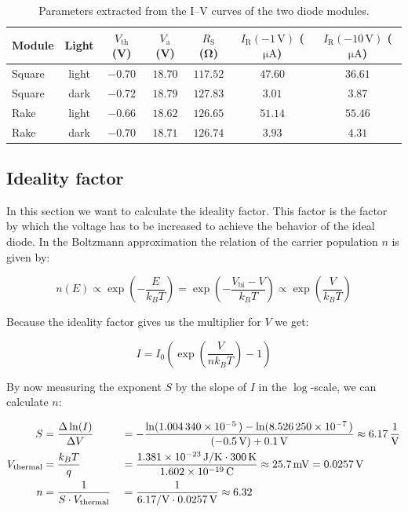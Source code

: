 \begin{table}[H]
\centering\small
\caption{Parameters extracted from the I--V curves of the two diode modules.}
\label{tab:diode-iv}
\begin{tabular}{lcccccc}
\toprule
Module & Light & $V_{\mathrm{th}}$ (V) & $V_\mathrm{a}$ (V) & $R_\mathrm{S}$ (\si{\ohm}) & $I_\mathrm{R}(-1\,\mathrm V)$ ($\si{\micro \A}$) & $I_\mathrm{R}(-10\,\mathrm V)$ ($\si{\micro \A}$)\\
\midrule
Square & light & $-0.70$ & $18.70$ & $117.52$ & $47.60$ & $36.61$ \\
Square & dark & $-0.72$ & $18.79$ & $127.83$ & $3.01$  & $3.87$  \\
Rake   & light & $-0.66$ & $18.62$ & $126.65$ & $51.14$ & $55.46$ \\
Rake   & dark & $-0.70$ & $18.71$ & $126.74$ & $3.93$  & $4.31$ \\
\bottomrule
\end{tabular}
\end{table}


\subsection{Ideality factor}\label{sec:iv-n}

In this section we want to calculate the ideality factor. This factor is the factor by which the voltage has to be increased
to achieve the behavior of the ideal diode. In the Boltzmann approximation the relation of the carrier population $n$ is given by:

\[
  n(E) \propto \exp\left(- \frac {E}{k_B T}\right) = \exp\left(- \frac {V_{\text{bi}} - V}{k_B T}\right) \propto \exp\left(\frac {V}{k_B T}\right)
\]

Because the ideality factor gives us the multiplier for $V$ we get:

\[
  I = I_0 \left(\exp\left(\frac {V}{ n k_B T}\right) - 1 \right)
\]

By now measuring the exponent $S$ by the slope of $I$ in the $\log$-scale, we can calculate $n$:

\begin{align*}
  S &= \frac{\Delta \ln(I)}{\Delta V}  &&= - \frac{\ln(\SI{1.004340e-5}) - \ln(\SI{8.526250e-7})}{(\SI{-0.5}{\V}) +\SI{0.1}{\V}}  \approx  \SI {6,17}{ \frac{1}{\V}} \\
  V_{\text{thermal}} &= \frac{k_B T }{q} &&= \frac{\SI{1.381e-23}{\joule\per\kelvin} \cdot \SI{300}{\kelvin}}{\SI{1.602e-19}{\coulomb}} \approx \SI{25,7}{ \milli \V} = \SI {0,0257} {\V} \\
  n &= \frac {1} {S \cdot V_\text{thermal}} &&= \frac{1}{\SI{6.17}{\per\V} \cdot \SI{0.0257}{\V}} \approx 6.32
\end{align*}

